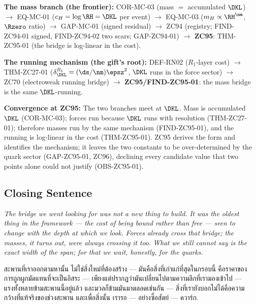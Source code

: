 \documentclass[12pt, a4paper]{article}
\begin{document}
\begin{genealogybox}[title={How ZC95 Sits in the Corpus}]
\textbf{The mass branch (the frontier):}
COR-MC-03 (mass $=$ accumulated $\DKL$) $\to$ EQ-MC-01 ($c_H=\log\RH=\DKL$
per event) $\to$ EQ-MC-03 ($m_H\propto\RH^{\nm}$, $\Rzero$ ratio) $\to$
GAP-MC-01 (signed residual) $\to$ ZC94 (registry; FIND-ZC94-01 signed,
FIND-ZC94-02 two scars; GAP-ZC94-01) $\to$ \textbf{ZC95}: THM-ZC95-01 (the
bridge is log-linear in the cost).

\smallskip
\textbf{The running mechanism (the gift's root):}
DEF-RN02 ($R_1$-layer cost) $\to$ THM-ZC27-01 ($\delta_{\DKL}^{R_1}=
(\ds/\nm)\epsz^2$, $\DKL$ runs in the force sector) $\to$ ZC70 (electroweak
running bridge) $\to$ \textbf{ZC95/FIND-ZC95-01}: the mass bridge is the same
$\DKL$-running.

\smallskip
\textbf{Convergence at ZC95:}
The two branches meet at $\DKL$. Mass is accumulated $\DKL$ (COR-MC-03); forces
run because $\DKL$ runs with resolution (THM-ZC27-01); therefore masses run by
the same mechanism (FIND-ZC95-01), and the running is log-linear in the cost
(THM-ZC95-01). ZC95 derives the form and identifies the mechanism; it leaves the
two constants to be over-determined by the quark sector (GAP-ZC95-01, ZC96),
declining every candidate value that two points alone could not justify
(OBS-ZC95-01).
\end{genealogybox}

\subsection{Closing Sentence}

\bigskip
\begin{center}
\textit{%
  The bridge we went looking for was not a new thing to build. It was the
  oldest thing in the framework --- the cost of being bound rather than free ---
  seen to change with the depth at which we look. Forces already cross that
  bridge; the masses, it turns out, were always crossing it too. What we still
  cannot say is the exact width of the span; for that we wait, honestly, for the
  quarks.}

\medskip
{\thaifont
สะพานที่เราออกตามหานั้น ไม่ใช่สิ่งใหม่ที่ต้องสร้าง --- มันคือสิ่งที่เก่าแก่ที่สุดในกรอบนี้
คือราคาของการถูกผูกมัดแทนที่จะเป็นอิสระ --- เพียงแต่ปรากฏว่ามันเปลี่ยนไปตามความลึกที่เรามองเข้าไป ---
แรงทั้งหลายข้ามสะพานนี้อยู่แล้ว และมวลก็ข้ามมันมาตลอดเช่นกัน ---
สิ่งที่เรายังบอกไม่ได้คือความกว้างที่แท้จริงของช่วงสะพาน และเพื่อสิ่งนั้น เรารอ --- อย่างซื่อสัตย์ --- ควาร์ก.}
\end{center}
\end{document}
